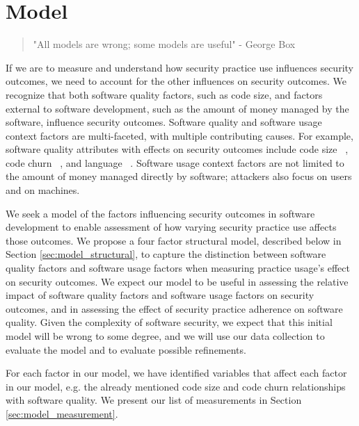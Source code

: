 \section{Model}
\label{sec:model}
\begin{quotation}
	"All models are wrong; some models are useful" - George Box
\end{quotation}


 If we are to measure and understand how security practice use influences security outcomes, we need to account for the other influences on security outcomes. We recognize that both software quality factors, such as code size, and factors external to software development, such as the amount of money managed by the software, influence security outcomes. Software quality and software usage context factors are multi-faceted, with multiple contributing causes. For example, software quality attributes with effects on security outcomes include code size ~\cite{alhazmi2007measuring}, code churn ~\cite{shin2011evaluating}, and language ~\cite{ray2014a}. Software usage context factors are not limited to the amount of money managed directly by software; attackers also focus on users and on machines. 
 
 We seek a model of the factors influencing security outcomes in software development to enable assessment of how varying security practice use affects those outcomes.  We propose a four factor structural model, described below in Section \ref{sec:model_structural}, to capture the distinction between software quality factors and software usage factors when measuring practice usage's effect on security outcomes. We expect our model to be useful in assessing the relative impact of software quality factors and software usage factors on security outcomes, and in assessing the effect of security practice adherence on software quality. Given the complexity of software security, we expect that this initial model will be wrong to some degree, and we will use our data collection to evaluate the model and to evaluate possible refinements.

For each factor in our model, we have identified variables that affect each factor in our model, e.g. the already mentioned code size and code churn relationships with software quality. We present our list of measurements in Section \ref{sec:model_measurement}.

